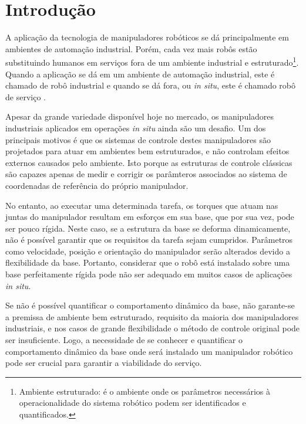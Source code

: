 \chapter{Introdução}

A aplicação da tecnologia de manipuladores robóticos se dá principalmente
em ambientes de automação industrial. Porém, cada vez mais robôs estão
substituindo humanos em serviços fora de um ambiente industrial e
estruturado\footnote{Ambiente estruturado: é o ambiente onde os parâmetros
necessários à operacionalidade do sistema robótico podem ser identificados e
quantificados.}. Quando a aplicação se dá em um ambiente de automação
industrial, este é chamado de robô industrial e quando se dá fora, ou
\textit{in situ}, este é chamado robô de serviço \cite{ISO8373}.

Apesar da grande variedade disponível hoje no mercado, os manipuladores
industriais aplicados em operações \textit{in situ} ainda são um desafio.
Um dos principais motivos é que os sistemas de controle destes
manipuladores são projetados para atuar em ambientes bem estruturados, e não
controlam efeitos externos causados pelo ambiente. Isto porque as
estruturas de controle clássicas são capazes apenas de medir e corrigir os
parâmteros associados ao sistema de coordenadas de referência do próprio
manipulador.

No entanto, ao executar uma determinada tarefa, os torques que atuam nas
juntas do manipulador resultam em esforços em sua base, que por
sua vez, pode ser pouco rígida. Neste caso, se a estrutura da base se deforma
dinamicamente, não é possível garantir que os requisitos da tarefa sejam
cumpridos. Parâmetros como velocidade, posição e orientação do manipulador serão
alterados devido a flexibilidade da base.
Portanto, considerar que o robô está instalado sobre uma base perfeitamente
rígida pode não ser adequado em muitos casos de aplicações \textit{in situ}.

Se não é possível quantificar o comportamento dinâmico da base, não garante-se
a premissa de ambiente bem estruturado, requisito da maioria dos manipuladores
industriais, e nos casos de grande flexibilidade o método de controle original
pode ser insuficiente.
Logo, a necessidade de se conhecer e quantificar o comportamento dinâmico da
base onde será instalado um manipulador robótico pode ser crucial para garantir
a viabilidade do serviço. 

